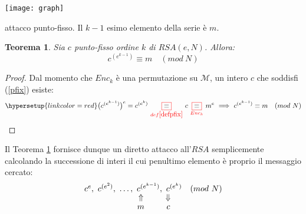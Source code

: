 \documentclass[twoside,symmetric,justified,openany,nobib]{tufte-book}
\newtheorem{thm}{Teorema}
\newtheorem{definizione}{Definizione}
\begin{document}
\begin{marginfigure}
  \begin{changemargin}{0.5cm}{0cm}
    \centering
    \texttt{[image: graph]}
    \caption{attacco punto-fisso. Il $k{-}1$ esimo elemento della serie è $m$.}
  \end{changemargin}
\end{marginfigure}
\begin{thm}
  \label{thpfix}
  Sia $c$ punto-fisso ordine $k$ di $RSA(e,N)$. Allora:
  \begin{equation}
    \label{pfix}
    c^{(e^{k-1})} \equiv m\quad (mod\ N)
  \end{equation}
\end{thm}
\begin{proof}
  Dal momento che $Enc_k$ è una permutazione su $\mathcal{M}$, un intero $c$ che soddisfi (\ref{pfix}) esiste:
  \begin{equation*}
    \hypersetup{linkcolor=red}
    \bigl(c^{(e^{k-1})}\bigr)^e=c^{(e^k)}\ {\color{red}\underset{def\ref{defpfix}}{\boxed{\color{black}\equiv}}}\ c\ {\color{red}\underset{Enc_k}{\boxed{\color{black}\equiv}}}\ m^e\ \Longrightarrow\ c^{(e^{k-1})} \equiv m\quad (mod\ N)
  \end{equation*}
\end{proof}
\noindent
Il Teorema \ref{thpfix} fornisce dunque un diretto attacco all'$RSA$ semplicemente calcolando la successione di interi il cui penultimo elemento è proprio il messaggio cercato:
\[
  \begin{array}{c}
    c^e,\ c^{(e^2)},\ \dots,\ c^{(e^{k-1})},\ c^{(e^{k})}\quad (mod\ N)\\
    \hspace{3pt}\text{\raisebox{0.5\height}{$\Uparrow$}} \hspace{27pt}\text{\raisebox{0.5\height}{$\Downarrow$}}\\
    \hspace{1pt}\text{\raisebox{1\height}{$m$}} \hspace{27pt}\text{\raisebox{1\height}{$c$}}
  \end{array}
\]
\end{document}
